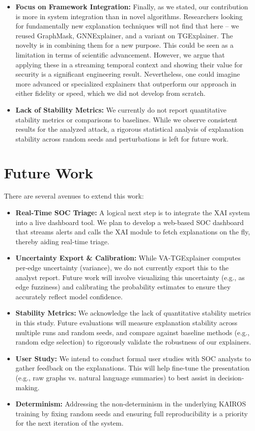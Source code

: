 \documentclass[conference]{IEEEtran}
\begin{document}
\begin{itemize}
    \item \textbf{Focus on Framework Integration:} Finally, as we stated, our contribution is more in system integration than in novel algorithms. Researchers looking for fundamentally new explanation techniques will not find that here -- we reused GraphMask, GNNExplainer, and a variant on TGExplainer. The novelty is in combining them for a new purpose. This could be seen as a limitation in terms of scientific advancement. However, we argue that applying these in a streaming temporal context and showing their value for security is a significant engineering result. Nevertheless, one could imagine more advanced or specialized explainers that outperform our approach in either fidelity or speed, which we did not develop from scratch.
    \item \textbf{Lack of Stability Metrics:} We currently do not report quantitative stability metrics or comparisons to baselines. While we observe consistent results for the analyzed attack, a rigorous statistical analysis of explanation stability across random seeds and perturbations is left for future work.
\end{itemize}

\section{Future Work}
There are several avenues to extend this work:
\begin{itemize}
    \item \textbf{Real-Time SOC Triage:} A logical next step is to integrate the XAI system into a live dashboard tool. We plan to develop a web-based SOC dashboard that streams alerts and calls the XAI module to fetch explanations on the fly, thereby aiding real-time triage.
    \item \textbf{Uncertainty Export \& Calibration:} While VA-TGExplainer computes per-edge uncertainty (variance), we do not currently export this to the analyst report. Future work will involve visualizing this uncertainty (e.g., as edge fuzziness) and calibrating the probability estimates to ensure they accurately reflect model confidence.
    \item \textbf{Stability Metrics:} We acknowledge the lack of quantitative stability metrics in this study. Future evaluations will measure explanation stability across multiple runs and random seeds, and compare against baseline methods (e.g., random edge selection) to rigorously validate the robustness of our explainers.
    \item \textbf{User Study:} We intend to conduct formal user studies with SOC analysts to gather feedback on the explanations. This will help fine-tune the presentation (e.g., raw graphs vs. natural language summaries) to best assist in decision-making.
    \item \textbf{Determinism:} Addressing the non-determinism in the underlying KAIROS training by fixing random seeds and ensuring full reproducibility is a priority for the next iteration of the system.
\end{itemize}
\end{document}
